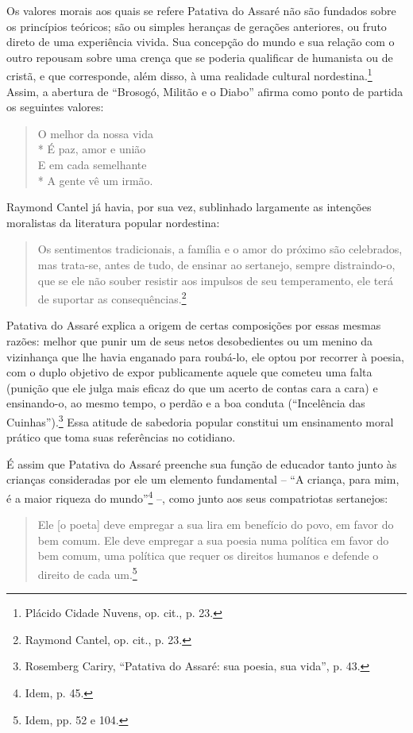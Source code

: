 Os valores morais aos quais se refere Patativa do Assaré não são fundados sobre
os princípios teóricos; são ou simples heranças de gerações anteriores, ou fruto
direto de uma experiência vivida. Sua concepção do mundo e sua relação com o
outro repousam sobre uma crença que se poderia qualificar de humanista ou de
cristã, e que corresponde, além disso, à uma realidade cultural
nordestina.\footnote{ Plácido Cidade Nuvens, op. cit., p. 23.} Assim, a
abertura de “Brosogó, Militão e o Diabo” afirma como ponto de partida os
seguintes valores:

\begin{verse}
O melhor da nossa vida\\*
É paz, amor e união\\
E em cada semelhante\\*
A gente vê um irmão.
\end{verse}

Raymond Cantel já havia, por sua vez, sublinhado largamente as intenções
moralistas da literatura popular nordestina:

\begin{quote}
Os sentimentos tradicionais, a
família e o amor do próximo são celebrados, mas trata-se, antes de tudo, de
ensinar ao sertanejo, sempre distraindo-o, que se ele não souber resistir aos
impulsos de seu temperamento, ele terá de suportar as consequências.\footnote{
Raymond Cantel, op. cit., p. 23.}
\end{quote}

\noindent Patativa do Assaré explica a origem
de certas composições por essas mesmas razões: melhor que punir um de seus netos
desobedientes ou um menino da vizinhança que lhe havia enganado para roubá-lo,
ele optou por recorrer à poesia, com o duplo objetivo de expor publicamente
aquele que cometeu uma falta (punição que ele julga mais eficaz do que um acerto
de contas cara a cara) e ensinando-o, ao mesmo tempo, o perdão e a boa conduta
(“Incelência das Cuinhas”).\footnote{ Rosemberg Cariry, “Patativa do Assaré: sua
poesia, sua vida”, p. 43.} Essa atitude de sabedoria popular constitui um
ensinamento moral prático que toma suas referências no cotidiano.

É assim que Patativa do Assaré preenche sua função de educador tanto junto às
crianças consideradas por ele um elemento fundamental -- “A criança, para mim, é
a maior riqueza do mundo”\footnote{ Idem, p. 45.} --, como junto aos
seus compatriotas sertanejos:

\begin{quote}
Ele [o poeta] deve empregar a sua lira em
benefício do povo, em favor do bem comum. Ele deve empregar a sua poesia numa
política em favor do bem comum, uma política que requer os direitos humanos e
defende o direito de cada um.\footnote{ Idem, pp. 52 e 104.}
\end{quote}

